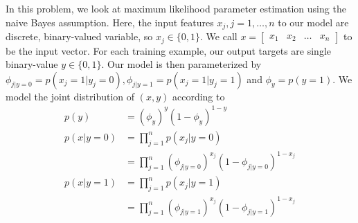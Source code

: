 \documentclass[a4paper,14pt]{article}
\begin{document}
In this problem, we look at maximum likelihood parameter estimation using the naive
Bayes assumption. Here, the input features $x_{j}, j = 1,\dots,n$ to our model are discrete,
binary-valued variable, so $x_{j} \in \{0,1\}$. We call $x=\begin{bmatrix}
    x_{1} & x_{2} & \dots & x_{n}
\end{bmatrix}$ to be the input vector. For each training example, our output targets are
single binary-value $y \in \{0,1\}$. Our model is then parameterized  by $\phi_{j|y=0} = p(x_{j}=1|y_{j}=0),\phi_{j|y=1} = p(x_{j}=1|y_{j}=1)$
and $\phi_{y} = p(y=1)$. We model the joint distribution of $(x,y)$ according to
\begin{align*}
    p(y) &= (\phi_{y})^{y}(1-\phi_{y})^{1-y} \\
    p(x|y=0) &= \prod_{j=1}^{n}p(x_{j}|y=0) \\
                &= \prod_{j=1}^{n}(\phi_{j|y=0})^{x_{j}}(1-\phi_{j|y=0})^{1-x_{j}} \\
    p(x|y=1) &= \prod_{j=1}^{n}p(x_{j}|y=1) \\
                &= \prod_{j=1}^{n}(\phi_{j|y=1})^{x_{j}}(1-\phi_{j|y=1})^{1-x_{j}}
\end{align*}
\end{document}
